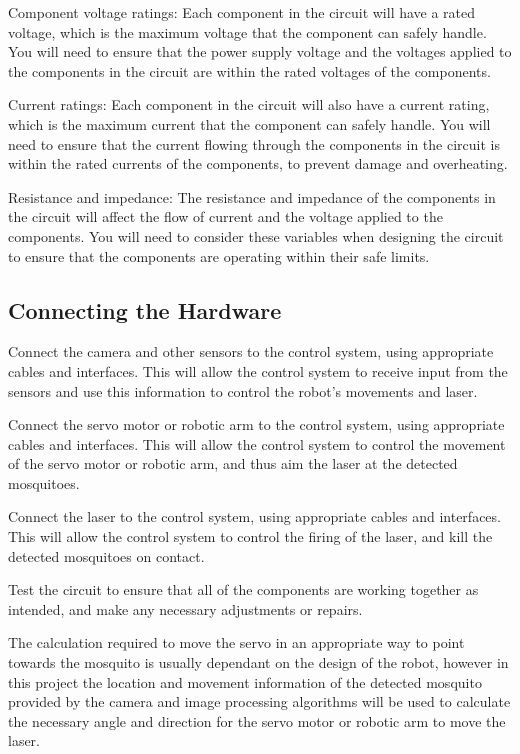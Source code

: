 \documentclass[11pt]{article}
\begin{document}
Component voltage ratings: Each component in the circuit will have a rated voltage, which is the maximum voltage that the component can safely handle. You will need to ensure that the power supply voltage and the voltages applied to the components in the circuit are within the rated voltages of the components.

Current ratings: Each component in the circuit will also have a current rating, which is the maximum current that the component can safely handle. You will need to ensure that the current flowing through the components in the circuit is within the rated currents of the components, to prevent damage and overheating.

Resistance and impedance: The resistance and impedance of the components in the circuit will affect the flow of current and the voltage applied to the components. You will need to consider these variables when designing the circuit to ensure that the components are operating within their safe limits.
 
 	 	\subsection{Connecting the Hardware}
 	
 	Connect the camera and other sensors to the control system, using appropriate cables and interfaces. This will allow the control system to receive input from the sensors and use this information to control the robot's movements and laser.
 	
 	Connect the servo motor or robotic arm to the control system, using appropriate cables and interfaces. This will allow the control system to control the movement of the servo motor or robotic arm, and thus aim the laser at the detected mosquitoes.
 	
 	Connect the laser to the control system, using appropriate cables and interfaces. This will allow the control system to control the firing of the laser, and kill the detected mosquitoes on contact.
 	
 	Test the circuit to ensure that all of the components are working together as intended, and make any necessary adjustments or repairs.
 	
 
 	The calculation required to move the servo in an appropriate way to point towards the mosquito is usually dependant on the  design of the robot, however in this project  the location and movement information of the detected mosquito provided by the camera and image processing algorithms will be used to calculate the necessary angle and direction for the servo motor or robotic arm to move the laser.
 	
\end{document}
